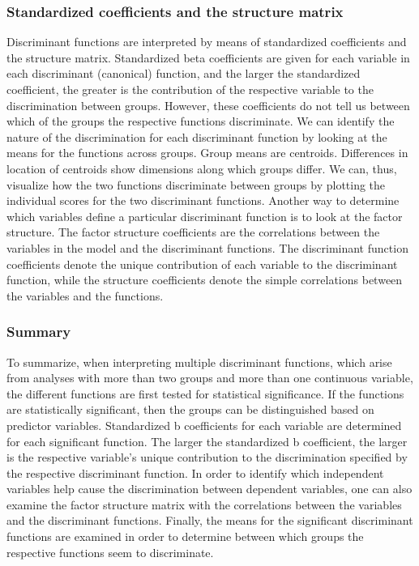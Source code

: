 \subsubsection{Standardized coefficients and the structure matrix}
Discriminant functions are interpreted by means of standardized coefficients and
the structure matrix. Standardized beta coefficients are given for each variable in
each discriminant (canonical) function, and the larger the standardized
coefficient, the greater is the contribution of the respective variable to the
discrimination between groups. However, these coefficients do not tell us
between which of the groups the respective functions discriminate. We can
identify the nature of the discrimination for each discriminant function by looking
at the means for the functions across groups. Group means are centroids.
Differences in location of centroids show dimensions along which groups differ.
We can, thus, visualize how the two functions discriminate between groups by
plotting the individual scores for the two discriminant functions.
Another way to determine which variables define a particular discriminant
function is to look at the factor structure. The factor structure coefficients are the
correlations between the variables in the model and the discriminant functions.
The discriminant function coefficients denote the unique contribution of each
variable to the discriminant function, while the structure coefficients denote the
simple correlations between the variables and the functions.
\subsubsection{Summary}
To summarize, when interpreting multiple discriminant functions, which arise
from analyses with more than two groups and more than one continuous
variable, the different functions are first tested for statistical significance. If the
functions are statistically significant, then the groups can be distinguished based
on predictor variables. Standardized b coefficients for each variable are
determined for each significant function. The larger the standardized b
coefficient, the larger is the respective variable's unique contribution to the
discrimination specified by the respective discriminant function. In order to
identify which independent variables help cause the discrimination between
dependent variables, one can also examine the factor structure matrix with the
correlations between the variables and the discriminant functions. Finally, the
means for the significant discriminant functions are examined in order to
determine between which groups the respective functions seem to discriminate.



